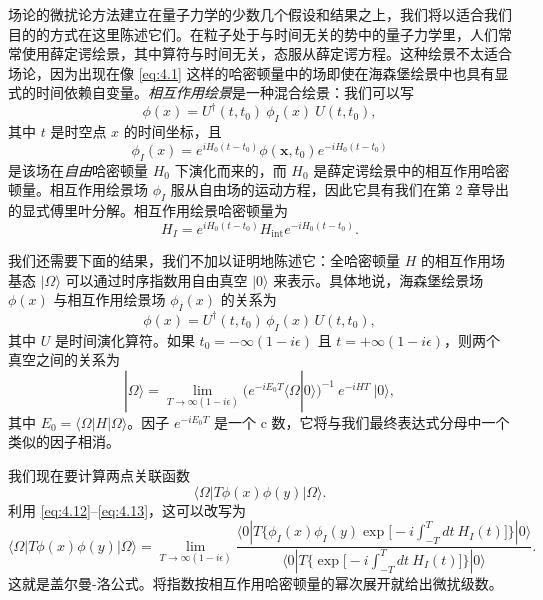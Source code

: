 场论的微扰论方法建立在量子力学的少数几个假设和结果之上，我们将以适合我们目的的方式在这里陈述它们。在粒子处于与时间无关的势中的量子力学里，人们常常使用薛定谔绘景，其中算符与时间无关，态服从薛定谔方程。这种绘景不太适合场论，因为出现在像 \eqref{eq:4.1} 这样的哈密顿量中的场即使在海森堡绘景中也具有显式的时间依赖自变量。\emph{相互作用绘景}是一种混合绘景：我们可以写
\begin{equation}
  \phi(x) = U^{\dagger}(t,t_0)\ \phi_I(x)\ U(t,t_0),
  \label{eq:4.10}
\end{equation}
其中 $t$ 是时空点 $x$ 的时间坐标，且
\begin{equation}
  \phi_I(x) = e^{iH_0(t-t_0)}\phi(\mathbf{x},t_0)e^{-iH_0(t-t_0)}
\end{equation}
是该场在\emph{自由}哈密顿量 $H_0$ 下演化而来的，而 $H_0$ 是薛定谔绘景中的相互作用哈密顿量。相互作用绘景场 $\phi_I$ 服从自由场的运动方程，因此它具有我们在第 2 章导出的显式傅里叶分解。相互作用绘景哈密顿量为
\begin{equation}
  H_I = e^{iH_0(t-t_0)}H_{\mathrm{int}}e^{-iH_0(t-t_0)} .
  \label{eq:4.11}
\end{equation}

我们还需要下面的结果，我们不加以证明地陈述它：全哈密顿量 $H$ 的相互作用场基态 $|\Omega\rangle$ 可以通过时序指数用自由真空 $|0\rangle$ 来表示。具体地说，海森堡绘景场 $\phi(x)$ 与相互作用绘景场 $\phi_I(x)$ 的关系为
\begin{equation}
  \phi(x) = U^{\dagger}(t, t_0)\,\phi_I(x)\,U(t, t_0),
  \label{eq:4.12}
\end{equation}
其中 $U$ 是时间演化算符。如果 $t_0 = -\infty(1-i\epsilon)$ 且 $t = +\infty(1-i\epsilon)$，则两个真空之间的关系为
\begin{equation}
  |\Omega\rangle = \lim_{T\to\infty(1-i\epsilon)}
    \bigl( e^{-iE_0T}\langle\Omega|0\rangle \bigr)^{-1}\ e^{-iHT}\ |0\rangle ,
  \label{eq:4.13}
\end{equation}
其中 $E_0 = \langle\Omega|H|\Omega\rangle$。因子 $e^{-iE_0T}$ 是一个 c 数，它将与我们最终表达式分母中一个类似的因子相消。

我们现在要计算两点关联函数
\begin{equation}
  \langle\Omega|T\phi(x)\phi(y)|\Omega\rangle .
  \label{eq:4.14}
\end{equation}
利用 \eqref{eq:4.12}--\eqref{eq:4.13}，这可以改写为
\begin{equation}
  \langle\Omega|T\phi(x)\phi(y)|\Omega\rangle
  = \lim_{T\to\infty(1-i\epsilon)}
    \frac{\langle 0|T\bigl\{ \phi_I(x)\phi_I(y)
      \exp\bigl[-i\int_{-T}^{T}dt\ H_I(t)\bigr]\bigr\}|0\rangle}
      {\langle 0|T\bigl\{ \exp\bigl[-i\int_{-T}^{T}dt\ H_I(t)\bigr]\bigr\}|0\rangle} .
  \label{eq:4.15}
\end{equation}
这就是盖尔曼-洛公式。将指数按相互作用哈密顿量的幂次展开就给出微扰级数。

